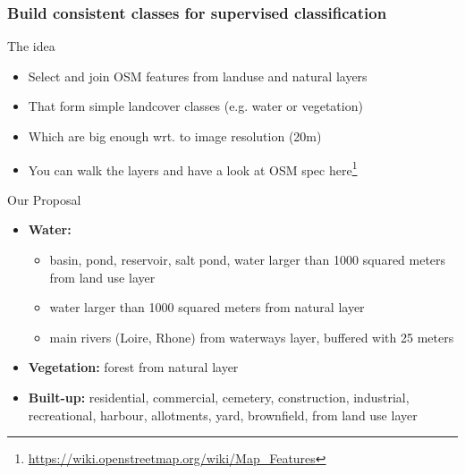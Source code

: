 \documentclass[8pt]{beamer}
\begin{document}
\begin{frame}[fragile]
\frametitle{Build consistent classes for supervised classification}
\begin{block}{The idea}
\begin{itemize}
\item Select and join OSM features from landuse and natural layers
\item That form simple landcover classes (e.g. water or vegetation)
\item Which are big enough wrt. to image resolution (20m)
\item You can walk the layers and have a look at OSM spec here\footnote{\url{https://wiki.openstreetmap.org/wiki/Map_Features}}
\end{itemize}
\end{block}

\begin{block}{Our Proposal}
\begin{itemize}
\item \textbf{Water:} 
  \begin{itemize}
  \item basin, pond, reservoir, salt pond, water larger than 1000 squared meters from land use layer
  \item water larger than 1000 squared meters from natural layer
  \item main rivers (Loire, Rhone) from waterways layer, buffered with 25 meters
  \end{itemize}
\item \textbf{Vegetation:} forest from natural layer
\item \textbf{Built-up:} residential, commercial, cemetery, construction, industrial, recreational, harbour, allotments, yard, brownfield, from land use layer
\end{itemize}
\end{block}

\end{frame}
\end{document}
